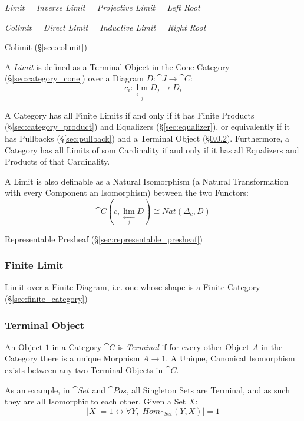 \emph{Limit} = \emph{Inverse Limit} = \emph{Projective Limit} =
\emph{Left Root}

\emph{Colimit} = \emph{Direct Limit} = \emph{Inductive Limit} =
\emph{Right Root}

Colimit (\S\ref{sec:colimit})

A \emph{Limit} is defined as a Terminal Object in the Cone Category
(\S\ref{sec:category_cone}) over a Diagram $D : \cat{J} \rightarrow
\cat{C}$:
\[
  c_i : \lim_{\xleftarrow[j]{}} D_j \rightarrow D_i
\]

A Category has all Finite Limits if and only if it has Finite Products
(\S\ref{sec:category_product}) and Equalizers (\S\ref{sec:equalizer}),
or equivalently if it has Pullbacks (\S\ref{sec:pullback}) and a
Terminal Object (\S\ref{sec:terminal_object}). Furthermore, a Category
has all Limits of som Cardinality if and only if it has all Equalizers
and Products of that Cardinality. \cite{awodey06}

A Limit is also definable as a Natural Isomorphism (a Natural
Transformation with every Component an Isomorphism) between the two
Functors:
\[
  \cat{C}(c, \lim_{\xleftarrow[j]{}} D) \cong Nat (\Delta_c, D)
\]

Representable Presheaf (\S\ref{sec:representable_presheaf})



\subsubsection{Finite Limit}\label{sec:finite_limit}

Limit over a Finite Diagram, i.e. one whose shape is a Finite Category
(\S\ref{sec:finite_category})



\subsubsection{Terminal Object}\label{sec:terminal_object}

An Object $1$ in a Category $\cat{C}$ is \emph{Terminal} if for
every other Object $A$ in the Category there is a unique Morphism $A
\rightarrow 1$. A Unique, Canonical Isomorphism exists between any two
Terminal Objects in $\cat{C}$.

As an example, in $\cat{Set}$ and $\cat{Pos}$, all Singleton
Sets are Terminal, and as such they are all Isomorphic to each other.
Given a Set $X$:
\[
  |X| = 1 \leftrightarrow \forall Y, |Hom_{\cat{Set}}(Y,X)| = 1
\]

